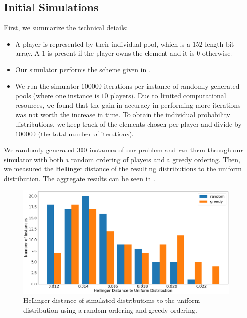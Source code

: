 \subsection{Initial Simulations}\label{Section:Initial-Simulations}

First, we summarize the technical details:
\begin{itemize}
    \item A player is represented by their individual pool, which is a $152$-length bit array.
    A $1$ is present if the player owns the element and it is $0$ otherwise.
    \item Our simulator performs the scheme given in .
    \item We run the simulator $100000$ iterations per instance of randomly generated pools (where one instance is $10$ players).
    Due to limited computational resources, we found that the gain in accuracy in performing more iterations was not worth the increase in time.
    To obtain the individual probability distributions, we keep track of the elements chosen per player and divide by $100000$ (the total number of iterations).
\end{itemize}

We randomly generated $300$ instances of our problem and ran them through our simulator with both a random ordering of players and a greedy ordering.
Then, we measured the Hellinger distance of the resulting distributions to the uniform distribution.
The aggregate results can be seen in .

\begin{figure}[htbp]
    \centering
    \includegraphics[width=.9\textwidth]{figures/simulations.png}
    \caption{Hellinger distance of simulated distributions to the uniform distribution using a random ordering and greedy ordering.}
    \label{Figure:simulation-results-histogram}
\end{figure}

